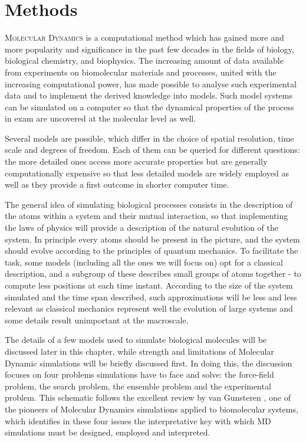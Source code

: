 \chapter{Methods} \label{chapter:MD}

\lettrine{M}{olecular Dynamics} is a computational method which has gained more and more popularity and significance in the past few decades in the fields of biology, biological chemistry, and biophysics.
%
The increasing amount of data available from experiments on biomolecular materials and processes, united with the increasing computational power, has made possible to analyse such experimental data and to implement the derived knowledge into models.
%
Such model systems can be simulated on a computer so that the dynamical properties of the process in exam are uncovered at the molecular level as well.

Several models are possible, which differ in the choice of spatial resolution, time scale and degrees of freedom.
%
Each of them can be queried for different questions: the more detailed ones access more accurate properties but are generally computationally expensive so that less detailed models are widely employed as well as they provide a first outcome in shorter computer time.

The general idea of simulating biological processes consists in the description of the atoms within a system and their mutual interaction, so that implementing the laws of physics will provide a description of the natural evolution of the system. In principle every atoms should be present in the picture, and the system should evolve according to the principles of quantum mechanics. To facilitate the task, some models (including all the ones we will focus on) opt for a classical description, and a subgroup of these describes small groups of atoms together - to compute less positions at each time instant. According to the size of the system simulated and the time span described, such approximations will be less and less relevant as classical mechanics represent well the evolution of large systems and some details result unimportant at the macroscale.

The details of a few models used to simulate biological molecules will be discussed later in this chapter, while  strength and limitations of Molecular Dynamic simulations will be briefly discussed first.
%
In doing this, the discussion focuses on four problems simulations have to face and solve: the force-field problem, the search problem, the ensemble problem and the experimental problem. This schematic follows the excellent review by van Gunsteren \cite{...}, one of the pioneers of Molecular Dynamics simulations applied to biomolecular systems, which identifies in these four issues the interpretative key with which MD simulations must be designed, employed and interpreted.

